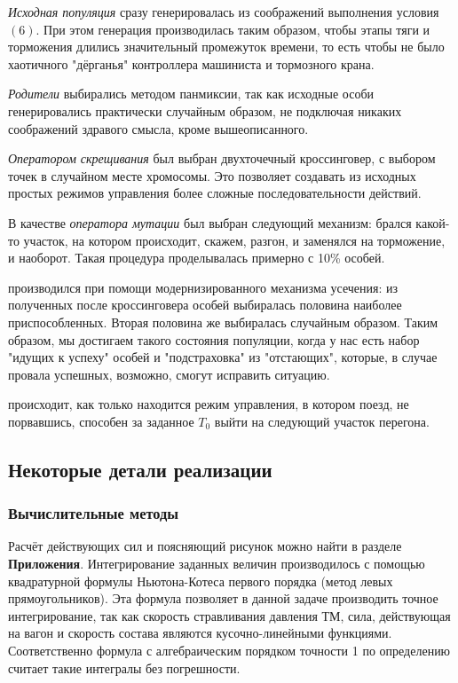 \textit{Исходная популяция} сразу генерировалась из соображений выполнения условия $(6)$. При этом генерация производилась таким образом, чтобы этапы тяги и торможения длились значительный промежуток времени, то есть чтобы не было хаотичного "дёрганья" контроллера машиниста и тормозного крана.

\textit{Родители} выбирались методом панмиксии, так как исходные особи генерировались практически случайным образом, не подключая никаких соображений здравого смысла, кроме вышеописанного.

\textit{Оператором скрещивания} был выбран двухточечный кроссинговер, с выбором точек в случайном месте хромосомы. Это позволяет создавать из исходных простых режимов управления более сложные последовательности действий.

В качестве \textit{оператора мутации} был выбран следующий механизм: брался какой-то участок, на котором происходит, скажем, разгон, и заменялся на торможение, и наоборот. Такая процедура проделывалась примерно с 10\% особей.

 производился при помощи модернизированного механизма усечения: из полученных после кроссинговера особей выбиралась половина наиболее приспособленных. Вторая половина же выбиралась случайным образом. Таким образом, мы достигаем такого состояния популяции, когда у нас есть набор "идущих к успеху" особей и "подстраховка" из "отстающих", которые, в случае провала успешных, возможно, смогут исправить ситуацию.

 происходит, как только находится режим управления, в котором поезд, не порвавшись, способен за заданное $T_0$ выйти на следующий участок перегона.

\subsection{Некоторые детали реализации}

\subsubsection{Вычислительные методы}
Расчёт действующих сил и поясняющий рисунок можно найти в разделе \textbf{Приложения}.
Интегрирование заданных величин производилось с помощью квадратурной формулы Ньютона-Котеса первого порядка (метод левых прямоугольников). Эта формула позволяет в данной задаче производить точное интегрирование, так как скорость стравливания давления ТМ,  сила, действующая на вагон и скорость состава являются кусочно-линейными функциями. Соответственно формула с алгебраическим порядком точности 1 по определению считает такие интегралы без погрешности.

